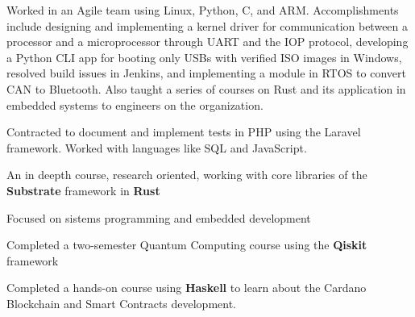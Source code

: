{Worked in an Agile team using Linux, Python, C, and ARM.
  Accomplishments include designing and implementing a kernel driver
  for communication between a processor and a microprocessor through UART and the IOP protocol,
  developing a Python CLI app for booting only USBs with verified ISO images in Windows,
  resolved build issues in Jenkins,
  and implementing a module in RTOS to convert CAN to Bluetooth.
  Also taught a series of courses on Rust and its application in embedded systems to engineers on the organization. }

{Contracted to document and implement tests in PHP using the Laravel framework.
  Worked with languages like SQL and JavaScript.}


{An in deepth course, research oriented, working with core libraries of the \textbf{Substrate} framework in \textbf{Rust}}

{Focused on sistems programming and embedded development}

{Completed a two-semester Quantum Computing course using the \textbf{Qiskit} framework}

{Completed a hands-on course using \textbf{Haskell} to learn about the Cardano Blockchain and Smart Contracts development.}


\sepspace
 


